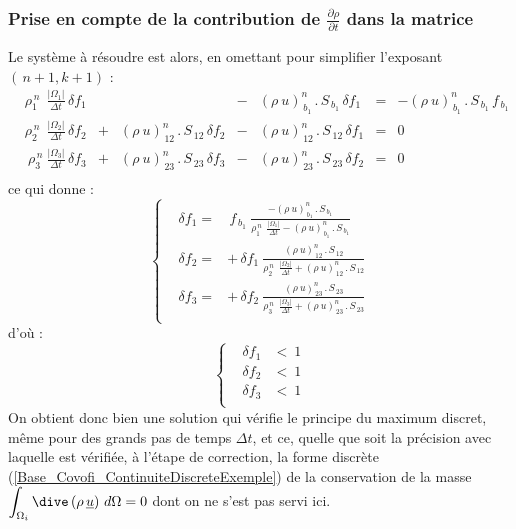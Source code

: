 \subsubsection*{Prise en compte de la contribution de
$\displaystyle\frac{\partial \rho}{\partial t}$ dans la matrice}
\label{Base_Covofi_PpmaxAvecDrhoDt}
Le syst\`eme \`a r\'esoudre est alors, en omettant pour simplifier l'exposant $(\,n+1,k+1)$ :
\begin{equation}
\begin{array}{lllllllll}
&\displaystyle \rho_1^{\,n}\ \displaystyle\ \frac{|\Omega_1|}{\Delta
t}\,\delta f_1&&\ \ \ \ \ \ \ \    &-&(\rho\ u)^n_{\,b_1}\,.\,S_{\,b_1}\,\delta
f_1 &= &-(\rho\ u)^n_{\,b_1}\,.\,S_{\,b_1}\,f_{\,b_1}\\
&\displaystyle\rho_2^{\,n}\ \displaystyle\ \frac{|\Omega_2|}{\Delta
t}\,\delta f_2 &+&(\rho\ u)^n_{\,12}\,.\,S_{\,12}\,\delta f_2  &-&(\rho\
u)^n_{\,12}\,.\,S_{\,12}\,\delta f_1 &= &0\\
&\displaystyle\ \rho_3^{\,n} \displaystyle\ \frac{|\Omega_3|}{\Delta
t}\,\delta f_3 &+&(\rho\ u)^n_{\,23}\,.\,S_{\,23}\,\delta f_3 &-&(\rho\
u)^n_{\,23}\,.\,S_{\,23}\,\delta f_2 &= &0\\
\end{array}
\end{equation}
ce qui donne :
\begin{equation}
\left\{\begin{array}{lll}
&\delta f_1 =& \,f_{\,b_1}\displaystyle\ \frac{-(\rho\ u)^n_{\,b_1}\,.\,S_{\,b_1}}{\rho_1^{\,n}\ \displaystyle\ \frac{|\Omega_1|}{\Delta
t} - (\rho\ u)^n_{\,b_1}\,.\,S_{\,b_1}}\\
&\delta f_2 =&+ \,\delta f_1 \displaystyle\ \frac{(\rho\
u)^n_{\,12}\,.\,S_{\,12}}{\rho_2^{\,n}\ \displaystyle\ \frac{|\Omega_2|}{\Delta t} + (\rho\ u)^n_{\,12}\,.\,S_{\,12}}\\
&\delta f_3 =&+ \,\delta f_2 \displaystyle\ \frac{(\rho\
u)^n_{\,23}\,.\,S_{\,23}}{\rho_3^{\,n}\ \displaystyle\ \frac{|\Omega_3|}{\Delta
t} + (\rho\ u)^n_{\,23}\,.\,S_{\,23}}\\
\end{array}\right.
\end{equation}
d'o\`u :
\begin{equation}
\left\{\begin{array}{lll}
& \delta f_1 & <\ 1 \\
& \delta f_2 & <\ 1 \\
& \delta f_3 & <\ 1 \\
\end{array}\right.
\end{equation}
On obtient donc bien une solution qui v\'erifie le principe du maximum discret,
m\^eme pour des grands pas de temps $\Delta t$, et ce, quelle que soit la
pr\'ecision avec laquelle est v\'erifi\'ee, \`a l'\'etape de correction, la
forme discr\`ete (\ref{Base_Covofi_ContinuiteDiscreteExemple}) de la conservation de la
masse $\displaystyle\int_{\Omega_i}\dive\,(\rho\,\underline{u})\ d\Omega = 0$
dont on ne s'est pas servi ici.


